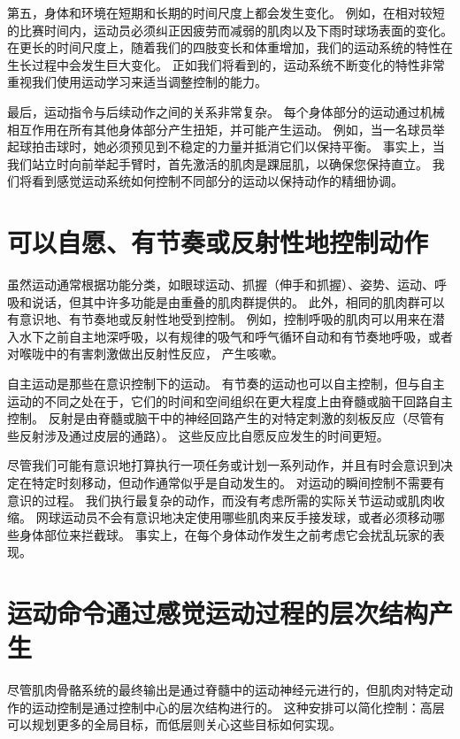 第五，身体和环境在短期和长期的时间尺度上都会发生变化。
例如，在相对较短的比赛时间内，运动员必须纠正因疲劳而减弱的肌肉以及下雨时球场表面的变化。
在更长的时间尺度上，随着我们的四肢变长和体重增加，我们的运动系统的特性在生长过程中会发生巨大变化。
正如我们将看到的，运动系统不断变化的特性非常重视我们使用运动学习来适当调整控制的能力。


最后，运动指令与后续动作之间的关系非常复杂。
每个身体部分的运动通过机械相互作用在所有其他身体部分产生扭矩，并可能产生运动。
例如，当一名球员举起球拍击球时，她必须预见到不稳定的力量并抵消它们以保持平衡。
事实上，当我们站立时向前举起手臂时，首先激活的肌肉是踝屈肌，以确保您保持直立。
我们将看到感觉运动系统如何控制不同部分的运动以保持动作的精细协调。



\section{可以自愿、有节奏或反射性地控制动作}

虽然运动通常根据功能分类，如眼球运动、抓握（伸手和抓握）、姿势、运动、呼吸和说话，但其中许多功能是由重叠的肌肉群提供的。
此外，相同的肌肉群可以有意识地、有节奏地或反射性地受到控制。
例如，控制呼吸的肌肉可以用来在潜入水下之前自主地深呼吸，以有规律的吸气和呼气循环自动和有节奏地呼吸，或者对喉咙中的有害刺激做出反射性反应， 产生咳嗽。


自主运动是那些在意识控制下的运动。
有节奏的运动也可以自主控制，但与自主运动的不同之处在于，它们的时间和空间组织在更大程度上由脊髓或脑干回路自主控制。
反射是由脊髓或脑干中的神经回路产生的对特定刺激的刻板反应（尽管有些反射涉及通过皮层的通路）。
这些反应比自愿反应发生的时间更短。


尽管我们可能有意识地打算执行一项任务或计划一系列动作，并且有时会意识到决定在特定时刻移动，但动作通常似乎是自动发生的。
对运动的瞬间控制不需要有意识的过程。
我们执行最复杂的动作，而没有考虑所需的实际关节运动或肌肉收缩。
网球运动员不会有意识地决定使用哪些肌肉来反手接发球，或者必须移动哪些身体部位来拦截球。
事实上，在每个身体动作发生之前考虑它会扰乱玩家的表现。



\section{运动命令通过感觉运动过程的层次结构产生}

尽管肌肉骨骼系统的最终输出是通过脊髓中的运动神经元进行的，但肌肉对特定动作的运动控制是通过控制中心的层次结构进行的。
这种安排可以简化控制：高层可以规划更多的全局目标，而低层则关心这些目标如何实现。



